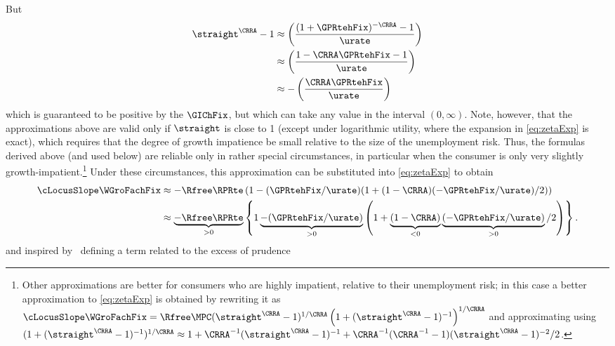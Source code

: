 \documentclass{econark}
\begin{document}
But
\begin{equation}\begin{gathered}\begin{aligned}
  \label{eq:hatpi}
  \straight^{\CRRA}-1 & \approx  \left(\frac{(1+\GPRtehFix)^{-\CRRA}-1}{\urate}\right)
\\ & \approx  \left(\frac{1- \CRRA \GPRtehFix-1}{\urate}\right)
\\ & \approx  -\left(\frac{\CRRA \GPRtehFix}{\urate}\right)
\end{aligned}\end{gathered}\end{equation}
which is guaranteed to be positive by the $\GIChFix$, but which can take any value in the interval $(0,\infty)$.  Note, however, that the approximations above are valid only if $\straight$ is close to 1 (except under logarithmic utility, where the expansion in \eqref{eq:zetaExp} is exact), which requires that the degree of growth impatience be small relative to the size of the unemployment risk.  Thus, the formulas derived above (and used below) are reliable only in rather special circumstances, in particular when the consumer is only very slightly growth-impatient.\footnote{Other approximations are better for consumers who are highly impatient, relative to their unemployment risk; in this case a better approximation to \eqref{eq:zetaExp} is obtained by rewriting it as $\cLocusSlope\WGroFachFix = \Rfree \MPC (\straight^{\CRRA}-1)^{1/\CRRA} \left(1+(\straight^{\CRRA}-1)^{-1}\right)^{1/\CRRA}$ and approximating using $(1+(\straight^{\CRRA}-1)^{-1})^{1/\CRRA} \approx 1 + \CRRA^{-1}(\straight^{\CRRA}-1)^{-1}+\CRRA^{-1}(\CRRA^{-1}-1)(\straight^{\CRRA}-1)^{-2}/2$.}  Under these circumstances, this approximation can be substituted into \eqref{eq:zetaExp} to obtain
\begin{equation}\begin{gathered}\begin{aligned}
  \cLocusSlope\WGroFachFix & \approx   -\Rfree \RPRte \left(1-(\GPRtehFix/\urate)(1+(1-\CRRA)(-\GPRtehFix/\urate)/2)\right)
\\ & \approx  \underbrace{-\Rfree \RPRte}_{>0} \left\{1\underbrace{-(\GPRtehFix/\urate)}_{>0}\left(1+\underbrace{(1-\CRRA)}_{<0}\underbrace{(-\GPRtehFix/\urate)}_{>0}/2\right)\right\} \label{eq:zetaGammaApprox}
.
\end{aligned}\end{gathered}\end{equation}
and inspired by~\cite{kimball:smallandlarge} defining a term related to the excess of prudence
\end{document}
